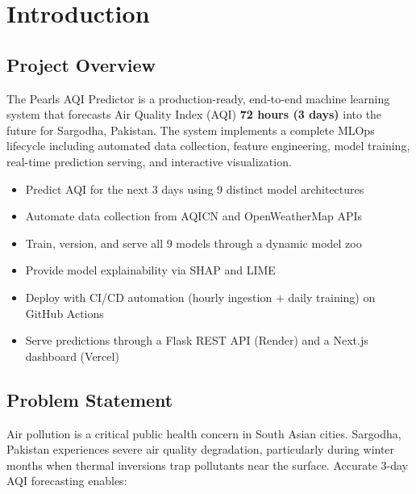 \documentclass[12pt, a4paper, oneside]{article}
\begin{document}
\tableofcontents


\listoffigures
\listoftables


\newpage
\section{Introduction}

\subsection{Project Overview}

The Pearls AQI Predictor is a production-ready, end-to-end machine learning system that forecasts Air Quality Index (AQI) \textbf{72 hours (3 days)} into the future for Sargodha, Pakistan. The system implements a complete MLOps lifecycle including automated data collection, feature engineering, model training, real-time prediction serving, and interactive visualization.

\begin{infobox}
\begin{itemize}[noitemsep]
    \item Predict AQI for the next 3 days using 9 distinct model architectures
    \item Automate data collection from AQICN and OpenWeatherMap APIs
    \item Train, version, and serve all 9 models through a dynamic model zoo
    \item Provide model explainability via SHAP and LIME
    \item Deploy with CI/CD automation (hourly ingestion + daily training) on GitHub Actions
    \item Serve predictions through a Flask REST API (Render) and a Next.js dashboard (Vercel)
\end{itemize}
\end{infobox}

\subsection{Problem Statement}

Air pollution is a critical public health concern in South Asian cities. Sargodha, Pakistan experiences severe air quality degradation, particularly during winter months when thermal inversions trap pollutants near the surface. Accurate 3-day AQI forecasting enables:
\end{document}

